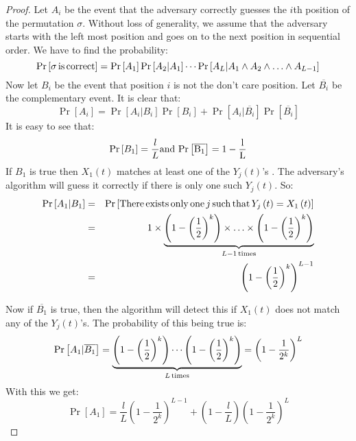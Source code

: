 \documentclass{llncs}
\begin{document}
\begin{proof}
Let $A_i$ be the event that the adversary correctly guesses the $i$th position of the permutation $\sigma$. Without loss of generality, we assume that the adversary starts with the left most position and goes on to the next position in sequential order. We have to find the probability:
\[
\Pr \left[ {\sigma \,{\rm{is}}\,{\rm{correct}}} \right] = \Pr \left[ {A_1 } \right]\Pr \left[ {A_2 |A_1 } \right] \cdots \Pr \left[ {A_L |A_1  \wedge A_2  \wedge  \ldots  \wedge A_{L - 1} } \right]
\]
Now let $B_i$ be the event that position $i$ is not the don't care position. Let $\overline {B_i }$ be the complementary event. It is clear that:
\[
\Pr \left[ {A_i } \right] = \Pr \left[ {A_i |B_i } \right]\Pr \left[ {B_i } \right] + \Pr \left[ {A_i |\overline {B_i } } \right]\Pr \left[ {\overline {B_i } } \right]
\]
It is easy to see that: 
\[
\Pr \left[ {B_1 } \right] = \frac{l}{L}  \rm{ and }  \,\Pr \left[ {\overline {B_1 } } \right] = 1 - \frac{l}{L}
\]
If $B_1$ is true then $X_1 \left( t \right)$ matches at least one of the $Y_j \left( t \right)$'s . The adversary's algorithm will guess it correctly if there is only one such $Y_j \left( t \right)$. So:
\begin{eqnarray*}
\Pr \left[ {A_1 |B_1 } \right]  &=&  \Pr \left[ {{\rm{There}}\,{\rm{exists}}\,{\rm{only}}\,{\rm{one}}\,j\,{\rm{such}}\,{\rm{that}}\,Y_j \left( t \right) = X_1 \left( t \right)} \right]\\  
    &=&  1 \times \underbrace {\left( {1 - \left( {\frac{1}{2}} \right)^k } \right) \times  \ldots  \times \left( {1 - \left( {\frac{1}{2}} \right)^k } \right)}_{L - 1\,{\rm{times}}} \\
    &=&  \left( {1 - \left( {\frac{1}{2}} \right)^k } \right)^{L - 1}  
\end{eqnarray*}

Now if $\overline {B_1 }$ is true, then the algorithm will detect this if $X_1 \left( t \right)$ does not match any of the $Y_j \left( t \right)$'s. The probability of this being true is:
\[
\Pr \left[ {A_1 |\overline {B_1 } } \right] = \underbrace {\left( {1 - \left( {\frac{1}{2}} \right)^k } \right) \cdots \left( {1 - \left( {\frac{1}{2}} \right)^k } \right)}_{L\,{\rm{times}}} 
   = \left( {1 - \frac{1}{{2^k }}} \right)^L  
\]
With this we get:
\[
\Pr \left[ {A_1 } \right] = \frac{l}{L}\left( {1 - \frac{1}{{2^k }}} \right)^{L - 1}  + \left( {1 - \frac{l}{L}} \right)\left( {1 - \frac{1}{{2^k }}} \right)^L 
\]


\end{proof}
\end{document}
